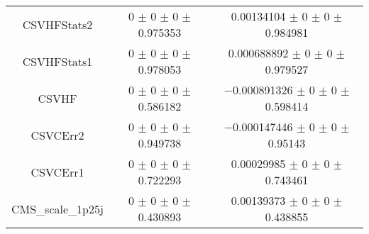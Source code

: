 \begin{table}
\begin{tabular}{ccc}
CSVHFStats2 	& \num{0} $\pm$ \num{0} $\pm$ \num{0} $\pm$ \num{0.975353} 	& \num{0.00134104} $\pm$ \num{0} $\pm$ \num{0} $\pm$ \num{0.984981}\\
CSVHFStats1 	& \num{0} $\pm$ \num{0} $\pm$ \num{0} $\pm$ \num{0.978053} 	& \num{0.000688892} $\pm$ \num{0} $\pm$ \num{0} $\pm$ \num{0.979527}\\
CSVHF 	& \num{0} $\pm$ \num{0} $\pm$ \num{0} $\pm$ \num{0.586182} 	& \num{-0.000891326} $\pm$ \num{0} $\pm$ \num{0} $\pm$ \num{0.598414}\\
CSVCErr2 	& \num{0} $\pm$ \num{0} $\pm$ \num{0} $\pm$ \num{0.949738} 	& \num{-0.000147446} $\pm$ \num{0} $\pm$ \num{0} $\pm$ \num{0.95143}\\
CSVCErr1 	& \num{0} $\pm$ \num{0} $\pm$ \num{0} $\pm$ \num{0.722293} 	& \num{0.00029985} $\pm$ \num{0} $\pm$ \num{0} $\pm$ \num{0.743461}\\
CMS\_scale\_1p25j 	& \num{0} $\pm$ \num{0} $\pm$ \num{0} $\pm$ \num{0.430893} 	& \num{0.00139373} $\pm$ \num{0} $\pm$ \num{0} $\pm$ \num{0.438855}\\
\bottomrule
\end{tabular}
\end{table}
